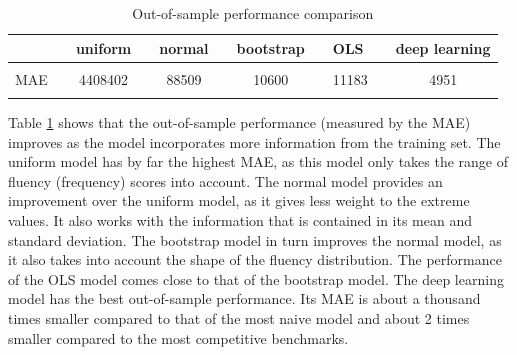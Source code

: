 \documentclass[11pt]{article}
\begin{document}
\vspace{0.5cm}
\begin{table}[h]
\centering
\caption{Out-of-sample performance comparison}
\label{tab:intrinsic}
\begin{tabular}{lllllllllll}
\hline
    &  & \textbf{uniform}                     &                      & \textbf{normal}                    &                      & \textbf{bootstrap}                 &  & \textbf{OLS}   &                      & \textbf{deep learning}            \\ \hline
    &  &                             &                      &                           &                      &                           &  &       &                      &                          \\
MAE &  & \multicolumn{1}{c}{4408402} & \multicolumn{1}{c}{} & \multicolumn{1}{c}{88509} & \multicolumn{1}{c}{} & \multicolumn{1}{c}{10600} &  & 11183 & \multicolumn{1}{c}{} & \multicolumn{1}{c}{4951} \\
    &  &                             &                      &                           &                      &                           &  &       &                      &                          \\ \hline
\end{tabular}
\end{table}
\vspace{0.5cm}

Table \ref{tab:intrinsic} shows that the out-of-sample performance (measured by the MAE) improves as the model incorporates more information from the training set. The uniform model has by far the highest MAE, as this model only takes the range of fluency (frequency) scores into account. The normal model provides an improvement over the uniform model, as it gives less weight to the extreme values. It also works with the information that is contained in its mean and standard deviation. The bootstrap model in turn improves the normal model, as it also takes into account the shape of the fluency distribution. The performance of the OLS model comes close to that of the bootstrap model. The deep learning model has the best out-of-sample performance. Its MAE is about a thousand times smaller compared to that of the most naive model and about 2 times smaller compared to the most competitive benchmarks.  
\end{document}
